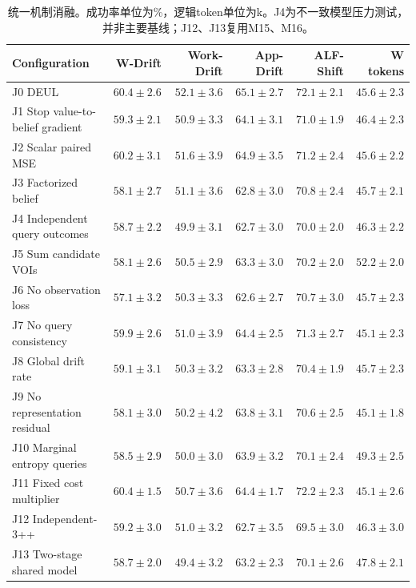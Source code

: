 \documentclass[sigconf,anonymous,review]{acmart}
\theoremstyle{zhplain}
\begin{document}
\begin{table}[t]
\centering
\caption{统一机制消融。成功率单位为\%，逻辑token单位为k。J4为不一致模型压力测试，并非主要基线；J12、J13复用M15、M16。}
\label{tab:joint}
\small
\begin{tabular}{@{}lrrrrr@{}}
\toprule
Configuration & W-Drift & Work-Drift & App-Drift & ALF-Shift & W tokens \\
\midrule
J0 DEUL & \(60.4\!\pm\!2.6\) & \(52.1\!\pm\!3.6\) & \(65.1\!\pm\!2.7\) & \(72.1\!\pm\!2.1\) & \(45.6\!\pm\!2.3\) \\
J1 Stop value-to-belief gradient & \(59.3\!\pm\!2.1\) & \(50.9\!\pm\!3.3\) & \(64.1\!\pm\!3.1\) & \(71.0\!\pm\!1.9\) & \(46.4\!\pm\!2.3\) \\
J2 Scalar paired MSE & \(60.2\!\pm\!3.1\) & \(51.6\!\pm\!3.9\) & \(64.9\!\pm\!3.5\) & \(71.2\!\pm\!2.4\) & \(45.6\!\pm\!2.2\) \\
J3 Factorized belief & \(58.1\!\pm\!2.7\) & \(51.1\!\pm\!3.6\) & \(62.8\!\pm\!3.0\) & \(70.8\!\pm\!2.4\) & \(45.7\!\pm\!2.1\) \\
J4 Independent query outcomes & \(58.7\!\pm\!2.2\) & \(49.9\!\pm\!3.1\) & \(62.7\!\pm\!3.0\) & \(70.0\!\pm\!2.0\) & \(46.3\!\pm\!2.2\) \\
J5 Sum candidate VOIs & \(58.1\!\pm\!2.6\) & \(50.5\!\pm\!2.9\) & \(63.3\!\pm\!3.0\) & \(70.2\!\pm\!2.0\) & \(52.2\!\pm\!2.0\) \\
J6 No observation loss & \(57.1\!\pm\!3.2\) & \(50.3\!\pm\!3.3\) & \(62.6\!\pm\!2.7\) & \(70.7\!\pm\!3.0\) & \(45.7\!\pm\!2.3\) \\
J7 No query consistency & \(59.9\!\pm\!2.6\) & \(51.0\!\pm\!3.9\) & \(64.4\!\pm\!2.5\) & \(71.3\!\pm\!2.7\) & \(45.1\!\pm\!2.3\) \\
J8 Global drift rate & \(59.1\!\pm\!3.1\) & \(50.3\!\pm\!3.2\) & \(63.3\!\pm\!2.8\) & \(70.4\!\pm\!1.9\) & \(45.7\!\pm\!2.3\) \\
J9 No representation residual & \(58.1\!\pm\!3.0\) & \(50.2\!\pm\!4.2\) & \(63.8\!\pm\!3.1\) & \(70.6\!\pm\!2.5\) & \(45.1\!\pm\!1.8\) \\
J10 Marginal entropy queries & \(58.5\!\pm\!2.9\) & \(50.0\!\pm\!3.0\) & \(63.9\!\pm\!3.2\) & \(70.1\!\pm\!2.4\) & \(49.3\!\pm\!2.5\) \\
J11 Fixed cost multiplier & \(60.4\!\pm\!1.5\) & \(50.7\!\pm\!3.6\) & \(64.4\!\pm\!1.7\) & \(72.2\!\pm\!2.3\) & \(45.1\!\pm\!2.6\) \\
J12 Independent-3++ & \(59.2\!\pm\!3.0\) & \(51.0\!\pm\!3.2\) & \(62.7\!\pm\!3.5\) & \(69.5\!\pm\!3.0\) & \(46.3\!\pm\!3.0\) \\
J13 Two-stage shared model & \(58.7\!\pm\!2.0\) & \(49.4\!\pm\!3.2\) & \(63.2\!\pm\!2.3\) & \(70.1\!\pm\!2.6\) & \(47.8\!\pm\!2.1\) \\
\bottomrule
\end{tabular}
\end{table}
\end{document}
